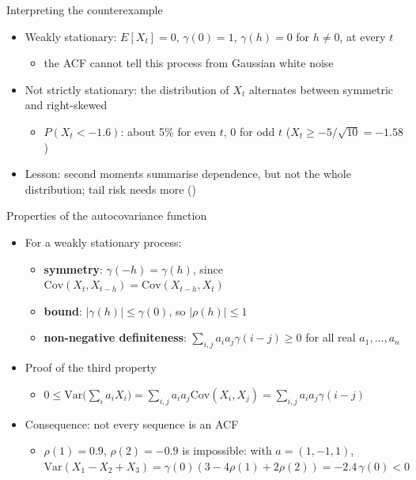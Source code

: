 \begin{frame}{Interpreting the counterexample}
\itemsize{\small}
\begin{itemize}
    \item Weakly stationary: $E[X_t] = 0$, $\gamma(0) = 1$, $\gamma(h) = 0$ for $h \ne 0$, at every $t$
    \begin{itemize}
        \item the ACF cannot tell this process from Gaussian white noise
    \end{itemize}
    \item Not strictly stationary: the distribution of $X_t$ alternates between symmetric and right-skewed
    \begin{itemize}
        \item $P(X_t < -1.6)$: about 5\% for even $t$, 0 for odd $t$ ($X_t \ge -5/\sqrt{10} = -1.58$)
    \end{itemize}
    \item Lesson: second moments summarise dependence, but not the whole distribution; tail risk needs more ()
\end{itemize}
\end{frame}

\begin{frame}{Properties of the autocovariance function}
\itemsize{\small}
\begin{itemize}
    \item For a weakly stationary process:
    \begin{itemize}
        \item \textbf{symmetry}: $\gamma(-h) = \gamma(h)$, since $\mathrm{Cov}(X_t, X_{t-h}) = \mathrm{Cov}(X_{t-h}, X_t)$
        \item \textbf{bound}: $|\gamma(h)| \le \gamma(0)$, so $|\rho(h)| \le 1$
        \item \textbf{non-negative definiteness}: $\sum_{i,j} a_i a_j \gamma(i - j) \ge 0$ for all real $a_1, \dots, a_n$
    \end{itemize}
    \item Proof of the third property
    \begin{itemize}
        \item $0 \le \mathrm{Var}\big(\sum_i a_i X_i\big) = \sum_{i,j} a_i a_j \mathrm{Cov}(X_i, X_j) = \sum_{i,j} a_i a_j \gamma(i - j)$
    \end{itemize}
    \item Consequence: not every sequence is an ACF
    \begin{itemize}
        \item $\rho(1) = 0.9$, $\rho(2) = -0.9$ is impossible: with $a = (1, -1, 1)$, $\mathrm{Var}(X_1 - X_2 + X_3) = \gamma(0)(3 - 4\rho(1) + 2\rho(2)) = -2.4\,\gamma(0) < 0$
    \end{itemize}
\end{itemize}
\end{frame}

